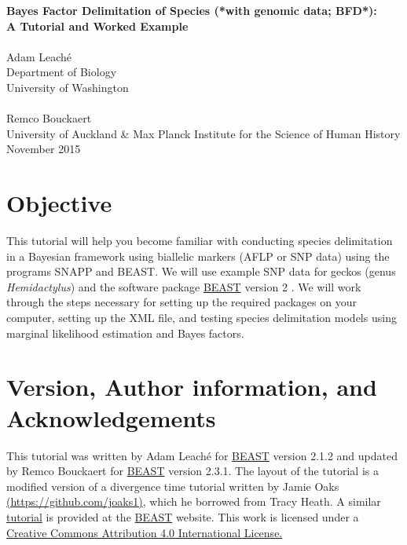 \documentclass{article}
\newcommand{\program}[1]{#1\xspace}
\newcommand{\beast}{\href{http://beast2.org}{\program{BEAST}}\xspace}
\begin{document}
{\Large\bf Bayes Factor Delimitation of Species (*with genomic data; BFD*):\\
A Tutorial and Worked Example}\\
\\
Adam Leach\'e\\
Department of Biology\\
University of Washington\\
\\
Remco Bouckaert\\
University of Auckland \& Max Planck Institute for the Science of Human History\\
November 2015\\
{\singlespacing \tableofcontents}
\newpage

\section{Objective}
This tutorial will help you become familiar with conducting species delimitation in a Bayesian framework using biallelic markers (AFLP or SNP data) using the programs \program{SNAPP} and \program{BEAST}.
We will use example SNP data for geckos (genus \textit{Hemidactylus}) and the software package \beast version 2 \citep{bouckaert14}.
We will work through the steps necessary for setting up the required packages on your computer, setting up the XML file, and testing species delimitation models using marginal likelihood estimation and Bayes factors.  

\section{Version, Author information, and Acknowledgements}
This tutorial was written by Adam Leach\'e for \beast version 2.1.2 and updated by Remco Bouckaert for \beast version 2.3.1.
The layout of the tutorial is a modified version of a divergence time tutorial written by Jamie Oaks \href{https://github.com/joaks1}{\url{(https://github.com/joaks1)}}, which he borrowed from Tracy Heath. 
A similar \href{http://www.beast2.org/wiki/index.php/BFD*}{tutorial} is provided at the \beast website. This work is licensed under a \href{http://creativecommons.org/licenses/by/4.0/deed.en_US}{Creative Commons Attribution 4.0 International License.}
\end{document}
